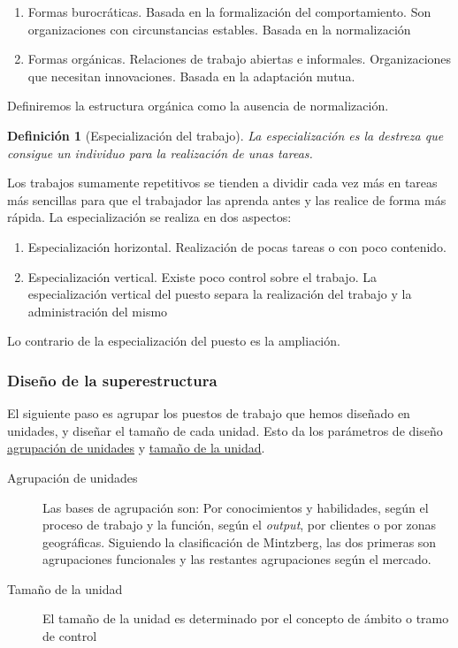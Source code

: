\documentclass[12pt]{article}
\theoremstyle{definition_wo_parentheses}
\newtheorem{definicion}{Definición}[section]
\begin{document}
\begin{enumerate}
\item Formas burocráticas. Basada en la formalización del comportamiento. Son organizaciones con circunstancias estables. Basada en la normalización
\item Formas orgánicas. Relaciones de trabajo abiertas e informales. Organizaciones que necesitan innovaciones. Basada en la adaptación mutua.
\end{enumerate}

Definiremos la estructura orgánica como la ausencia de normalización.

\begin{definicion}[Especialización del trabajo]
	La especialización es la destreza que consigue un individuo para la realización de unas tareas.
\end{definicion}

Los trabajos sumamente repetitivos se tienden a dividir cada vez más en tareas más sencillas para que el trabajador las aprenda antes y las realice de forma más rápida. La especialización se realiza en dos aspectos:

\begin{enumerate}[a]
\item Especialización horizontal. Realización de pocas tareas o con poco contenido.
\item Especialización vertical. Existe poco control sobre el trabajo. La especialización vertical del puesto separa la realización del trabajo y la administración del mismo
\end{enumerate}

Lo contrario de la especialización del puesto es la ampliación.

\subsubsection{Diseño de la superestructura}

El siguiente paso es agrupar los puestos de trabajo que hemos diseñado en unidades, y diseñar el tamaño de cada unidad. Esto da los parámetros de diseño \underline{agrupación de unidades} y \underline{tamaño de la unidad}.


\begin{description}
\item [Agrupación de unidades] Las bases de agrupación son: Por conocimientos y habilidades, según el proceso de trabajo y la función, según el \textit{output}, por clientes o por zonas geográficas. Siguiendo la clasificación de Mintzberg, las dos primeras son agrupaciones funcionales y las restantes agrupaciones según el mercado.

\item [Tamaño de la unidad] El tamaño de la unidad es determinado por el concepto de ámbito o tramo de control
\end{description}
\end{document}
